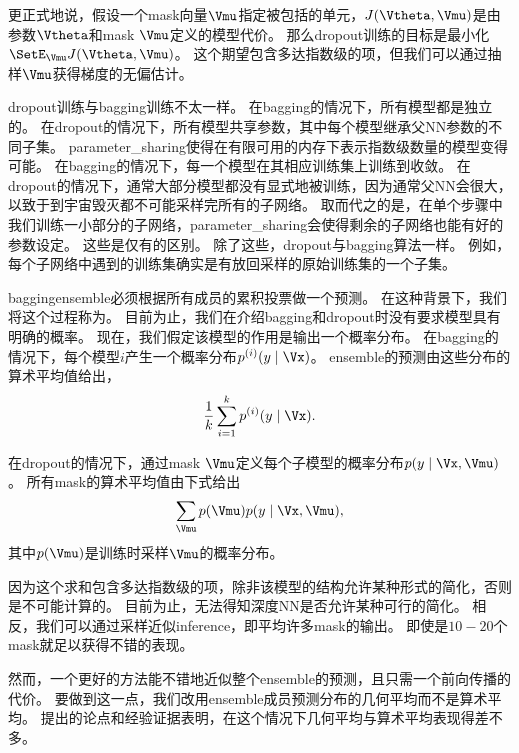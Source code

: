 更正式地说，假设一个\gls{mask}向量$\Vmu$指定被包括的单元，$J(\Vtheta, \Vmu)$是由参数$\Vtheta$和\gls{mask} $\Vmu$定义的模型代价。
那么\gls{dropout}训练的目标是最小化$\SetE_{\Vmu} J(\Vtheta, \Vmu)$。 
这个期望包含多达指数级的项，但我们可以通过抽样$\Vmu$获得梯度的无偏估计。

\gls{dropout}训练与\gls{bagging}训练不太一样。
在\gls{bagging}的情况下，所有模型都是独立的。
在\gls{dropout}的情况下，所有模型共享参数，其中每个模型继承父\gls{NN}参数的不同子集。
\gls{parameter_sharing}使得在有限可用的内存下表示指数级数量的模型变得可能。
在\gls{bagging}的情况下，每一个模型在其相应训练集上训练到收敛。
在\gls{dropout}的情况下，通常大部分模型都没有显式地被训练，因为通常父\gls{NN}会很大，以致于到宇宙毁灭都不可能采样完所有的子网络。
取而代之的是，在单个步骤中我们训练一小部分的子网络，\gls{parameter_sharing}会使得剩余的子网络也能有好的参数设定。
这些是仅有的区别。
除了这些，\gls{dropout}与\gls{bagging}算法一样。
例如，每个子网络中遇到的训练集确实是有放回采样的原始训练集的一个子集。

\gls{bagging}\gls{ensemble}必须根据所有成员的累积投票做一个预测。
在这种背景下，我们将这个过程称为。
目前为止，我们在介绍\gls{bagging}和\gls{dropout}时没有要求模型具有明确的概率。
现在，我们假定该模型的作用是输出一个概率分布。
在\gls{bagging}的情况下，每个模型$i$产生一个概率分布$p^{(i)}(y \mid \Vx)$。 
\gls{ensemble}的预测由这些分布的算术平均值给出，
\begin{align}
 \frac{1}{k} \sum_{i=1}^k p^{(i)}(y \mid \Vx).
\end{align}

在\gls{dropout}的情况下，通过\gls{mask} $\Vmu$定义每个子模型的概率分布$p(y \mid \Vx, \Vmu)$。
所有\gls{mask}的算术平均值由下式给出
\begin{align}
  \sum_{\Vmu} p(\Vmu) p(y \mid \Vx, \Vmu),
\end{align}
其中$p(\Vmu)$是训练时采样$\Vmu$的概率分布。


因为这个求和包含多达指数级的项，除非该模型的结构允许某种形式的简化，否则是不可能计算的。
目前为止，无法得知深度\gls{NN}是否允许某种可行的简化。
相反，我们可以通过采样近似\gls{inference}，即平均许多\gls{mask}的输出。
即使是$10-20$个\gls{mask}就足以获得不错的表现。

然而，一个更好的方法能不错地近似整个\gls{ensemble}的预测，且只需一个前向传播的代价。
要做到这一点，我们改用\gls{ensemble}成员预测分布的几何平均而不是算术平均。
\cite{WardeFarley+al-ICLR2014}提出的论点和经验证据表明，在这个情况下几何平均与算术平均表现得差不多。

